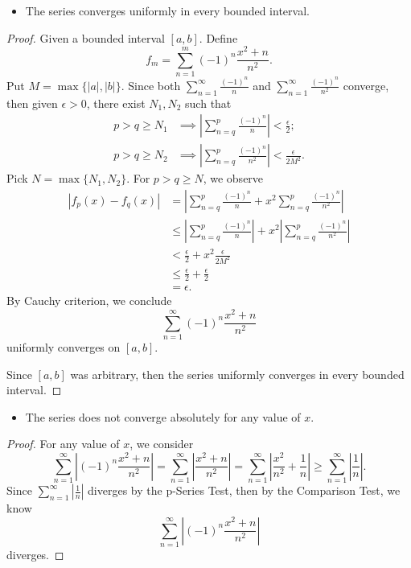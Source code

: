 \begin{Exercise}
	\begin{itemize}
		\item The series converges uniformly in every bounded interval.
	\end{itemize}
	\begin{proof}
		Given a bounded interval $[a,b]$.
		Define
		$$
		f_m = \sum_{n=1}^{m}(-1)^n \frac{x^2+n}{n^2}.
		$$
		Put $M = \max\{|a|, |b|\}$.
		Since both $\sum_{n=1}^{\infty}\frac{(-1)^n}{n}$ and $\sum_{n=1}^{\infty} \frac{(-1)^n}{n^2}$ converge, then given $\epsilon > 0$, there exist $N_1,N_2$ such that
		\begin{align*}
		p>q\geq N_1 &\implies \left| \sum_{n=q}^{p}\frac{(-1)^n}{n}\right| < \frac{\epsilon}{2}; \\
		p>q\geq N_2 &\implies \left| \sum_{n=q}^{p}\frac{(-1)^n}{n^2}\right| < \frac{\epsilon}{2 M^2}.
		\end{align*}
		Pick $N = \max\{N_1, N_2\}$.
		For $p > q \geq N$, we observe
		\begin{align*}
		\left| f_p(x) - f_q(x) \right|
		&= \left| \sum_{n=q}^{p}\frac{(-1)^n}{n} + x^2 \sum_{n=q}^{p}\frac{(-1)^n}{n^2} \right| \\
		&\leq \left| \sum_{n=q}^{p}\frac{(-1)^n}{n} \right| + x^2 \left| \sum_{n=q}^{p}\frac{(-1)^n}{n^2} \right| \\
		&< \frac{\epsilon}{2} + x^2 \frac{\epsilon}{2 M^2} \\
		&\leq \frac{\epsilon}{2} + \frac{\epsilon}{2} \\
		&= \epsilon.
		\end{align*}
		By Cauchy criterion, we conclude
		$$
		\sum_{n=1}^{\infty}(-1)^n \frac{x^2+n}{n^2}
		$$
		uniformly converges on $[a,b]$.
		
		Since $[a,b]$ was arbitrary, then the series uniformly converges in every bounded interval.
	\end{proof}
	
	\begin{itemize}
		\item The series does not converge absolutely for any value of $x$.
	\end{itemize}
	\begin{proof}
		For any value of $x$, we consider
		$$
		\sum_{n=1}^{\infty} \left| (-1)^n \frac{x^2+n}{n^2} \right|
		= \sum_{n=1}^{\infty} \left| \frac{x^2+n}{n^2} \right|
		= \sum_{n=1}^{\infty} \left| \frac{x^2}{n^2} + \frac{1}{n} \right|
		\geq \sum_{n=1}^{\infty} \left| \frac{1}{n} \right|.
		$$
		Since $\sum_{n=1}^{\infty} \left| \frac{1}{n} \right|$ diverges by the p-Series Test, then by the Comparison Test, we know
		$$
		\sum_{n=1}^{\infty} \left| (-1)^n \frac{x^2+n}{n^2} \right|
		$$
		diverges.
	\end{proof}
\end{Exercise}